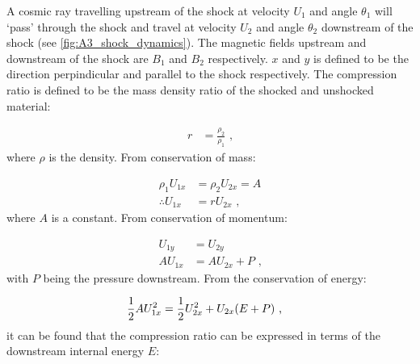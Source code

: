 A cosmic ray travelling upstream of the shock at velocity $U_1$ and angle $\theta_1$ will `pass' through the shock and travel at velocity $U_2$ and angle $\theta_2$ downstream of the shock (see \autoref{fig:A3_shock_dynamics}). The magnetic fields upstream and downstream of the shock are $B_1$ and $B_2$ respectively.  $x$ and $y$ is defined to be the direction perpindicular and parallel to the shock respectively.
The compression ratio is defined to be the mass density ratio of the shocked and unshocked material:

\begin{equation}
    \begin{aligned}
        r&=\frac{\rho_2}{\rho_1}\text{ ,}
    \end{aligned}
\end{equation}
\noindent where $\rho$ is the density. From conservation of mass:

\begin{equation}
    \begin{aligned}
        \rho_1U_{1x}&=\rho_2U_{2x}=A \\
        \therefore U_{1x}&=rU_{2x}\text{ ,}
    \end{aligned} \label{eq:A3_velocity_ratios}
\end{equation}
\noindent where $A$ is a constant. From conservation of momentum:

\begin{subequations}
    \begin{alignat}{1}
        U_{1y}&=U_{2y} \\
        AU_{1x}&=AU_{2x}+P\text{ ,}
    \end{alignat}
\end{subequations}
\noindent with $P$ being the pressure downstream. From the conservation of energy:

\begin{equation}
    \begin{aligned}
        \frac{1}{2}AU_{1x}^2&=\frac{1}{2}U_{2x}^2+U_{2x}\qty(E+P)\text{ ,}
    \end{aligned}
\end{equation}
\noindent it can be found that the compression ratio can be expressed in terms of the downstream internal energy $E$:

